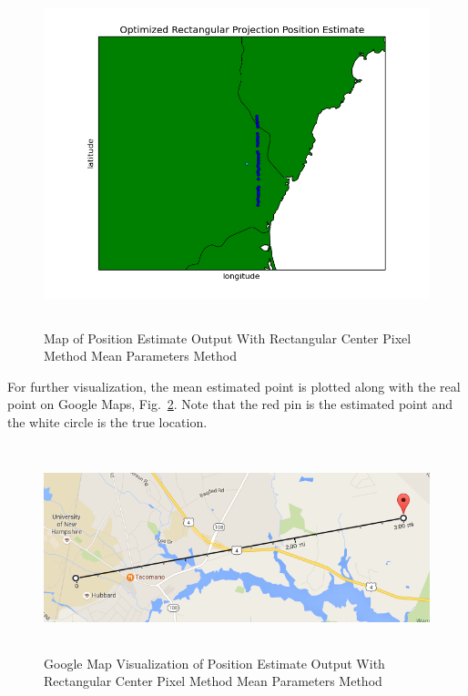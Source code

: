 \documentclass[12pt,a4paper]{book}
\begin{document}
\begin{figure}[!ht]
\centering
\includegraphics[height=10cm]{rectMeanParams_map.png}
\caption{Map of Position Estimate Output With Rectangular Center Pixel Method Mean Parameters Method}\label{f:rectMeanParams_map}
\end{figure}
For further visualization, the mean estimated point is plotted along with the real point on Google Maps, Fig.~\ref{f:cool}. Note that the red pin is the estimated point and the white circle is the true location.    

\begin{figure}[!ht]
\centering
\includegraphics[height=6cm]{cool.png}
\caption{Google Map Visualization of Position Estimate Output With Rectangular Center Pixel Method Mean Parameters Method}\label{f:cool}
\end{figure}
\FloatBarrier
\end{document}
